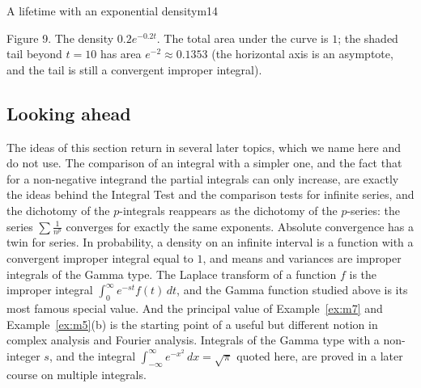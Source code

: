 \documentclass[11pt]{article}
\begin{document}
\begin{exmp}{A lifetime with an exponential density}{m14}
\begin{center}
\end{center}
\begin{center}\small Figure 9. The density $0.2e^{-0.2t}$. The total area under the curve is $1$; the shaded tail beyond $t=10$ has area $e^{-2}\approx0.1353$ (the horizontal axis is an asymptote, and the tail is still a convergent improper integral).\end{center}
\end{exmp}

\subsection*{Looking ahead}

The ideas of this section return in several later topics, which we name here and do not use. The comparison of an integral with a simpler one, and the fact that for a non-negative integrand the partial integrals can only increase, are exactly the ideas behind the Integral Test and the comparison tests for infinite series, and the dichotomy of the $p$-integrals reappears as the dichotomy of the $p$-series: the series $\sum\frac1{n^p}$ converges for exactly the same exponents. Absolute convergence has a twin for series. In probability, a density on an infinite interval is a function with a convergent improper integral equal to $1$, and means and variances are improper integrals of the Gamma type. The Laplace transform of a function $f$ is the improper integral $\int_0^\infty e^{-st}f(t)\,dt$, and the Gamma function studied above is its most famous special value. And the principal value of Example~\ref{ex:m7} and Example~\ref{ex:m5}(b) is the starting point of a useful but different notion in complex analysis and Fourier analysis. Integrals of the Gamma type with a non-integer $s$, and the integral $\int_{-\infty}^\infty e^{-x^2}\,dx=\sqrt\pi$ quoted here, are proved in a later course on multiple integrals.
\end{document}
